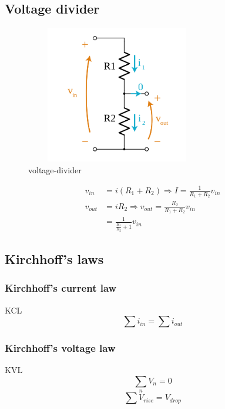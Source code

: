 \documentclass{article}
\begin{document}
\newpage
\subsection{Voltage divider}
\begin{figure}[h]
    \vspace{10mm}
    \centering
    \includegraphics[width=8cm, height=6cm]{image/voltage-divider.png}
    \caption{voltage-divider}
\end{figure}

\begin{align*}
  v_{in} &= i(R_1+R_2) \Rightarrow I = \frac{1}{R_1+R_2}v_{in} \\
  v_{out} &= iR_2 \Rightarrow v_{out} = \frac{R_2}{R_1+R_2}v_{in} \\
  &= \frac{1}{\frac{R_1}{R_2}+1}v_{in}
\end{align*}

\subsection{Kirchhoff's laws}
\subsubsection{Kirchhoff's current law}
KCL
\begin{equation} \sum i_{in} = \sum i_{out} \end{equation}

\subsubsection{Kirchhoff's voltage law}
KVL
\begin{equation} \sum_n V_{n} = 0 \end{equation}
\begin{equation} \sum V_{rise} = V_{drop} \end{equation}
\end{document}
